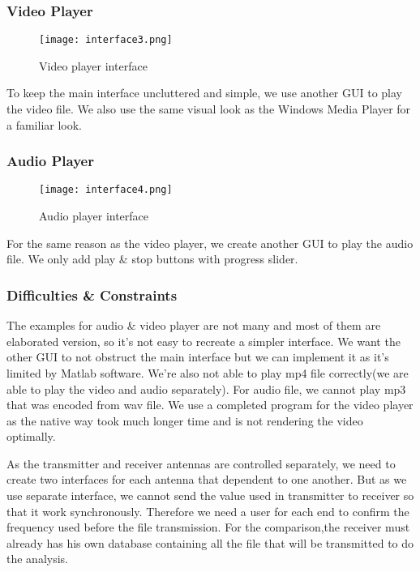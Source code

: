 \subsubsection{Video Player}
\begin{figure}[ht]
	\centering
		\texttt{[image: interface3.png]}
	\caption{Video player interface}
	\label{fig:interfacevid }
\end{figure}
\par \vspace{0.25cm}To keep the main interface uncluttered and simple, we use another GUI to play the video file. We also use the same visual look as the Windows Media Player for a familiar look.
\subsubsection{Audio Player}
\begin{figure}[ht]
	\centering
		\texttt{[image: interface4.png]}
	\caption{Audio player interface}
	\label{fig:interfaceaud }
\end{figure}
\par \vspace{0.25cm}For the same reason as the video player, we create another GUI to play the audio file. We only add play \& stop buttons with progress slider.

\clearpage
\subsubsection{Difficulties \& Constraints}
\par \vspace{0.25cm} The examples for audio \& video player are not many and most of them are elaborated version, so it's not easy to recreate a simpler interface. We want the other GUI to not obstruct the main interface but we can implement it as it's limited by Matlab software. We're also not able to play mp4 file correctly(we are able to play the video and audio separately). For audio file, we cannot play mp3 that was encoded from wav file. We use a completed program for the video player as the native way took much longer time and is not rendering the video optimally. 
\par \vspace{0.25cm} As the transmitter and receiver antennas are controlled separately, we need to create two interfaces for each antenna that dependent to one another. But as we use separate interface, we cannot send the value used in transmitter to receiver so that it work synchronously. Therefore we need a user for each end to confirm the frequency used before the file transmission. For the comparison,the receiver must already has his own database containing all the file that will be transmitted to do the analysis.
  
